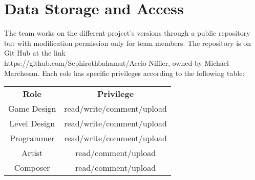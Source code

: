 \section{Data Storage and Access}
The team works on the different project's versions through a public repository but with modification permission only for team members. The repository is on Git Hub at the link\\ https://github.com/Sephirothbahamut/Accio-Niffler, owned by Michael Marchesan.
Each role has specific privileges according to the following table: \\

\begin{tabular} {cc}
 \textbf{Role} & \textbf{Privilege}\\
Game Design & read/write/comment/upload \\
Level Design & read/write/comment/upload \\
Programmer & read/write/comment/upload \\
Artist & read/comment/upload \\
Composer & read/comment/upload \\
\end{tabular}

\pagebreak